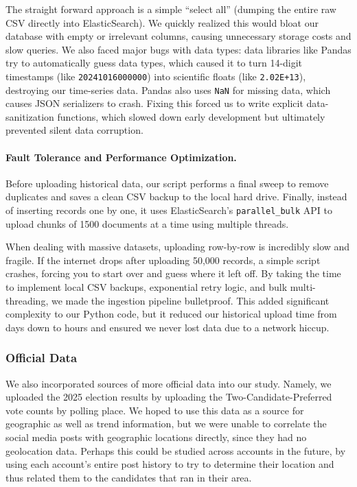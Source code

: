 The straight forward approach is a simple ``select all'' (dumping the entire raw CSV directly into ElasticSearch). We quickly realized this would bloat our database with empty or irrelevant columns, causing unnecessary storage costs and slow queries. We also faced major bugs with data types: data libraries like Pandas try to automatically guess data types, which caused it to turn 14-digit timestamps (like \texttt{20241016000000}) into scientific floats (like \texttt{2.02E+13}), destroying our time-series data. Pandas also uses \texttt{NaN} for missing data, which causes JSON serializers to crash. Fixing this forced us to write explicit data-sanitization functions, which slowed down early development but ultimately prevented silent data corruption.

\paragraph{Fault Tolerance and Performance Optimization.}
Before uploading historical data, our script performs a final sweep to remove duplicates and saves a clean CSV backup to the local hard drive. Finally, instead of inserting records one by one, it uses ElasticSearch's \texttt{parallel\_bulk} API to upload chunks of 1500 documents at a time using multiple threads.

When dealing with massive datasets, uploading row-by-row is incredibly slow and fragile. If the internet drops after uploading 50,000 records, a simple script crashes, forcing you to start over and guess where it left off. By taking the time to implement local CSV backups, exponential retry logic, and bulk multi-threading, we made the ingestion pipeline bulletproof. This added significant complexity to our Python code, but it reduced our historical upload time from days down to hours and ensured we never lost data due to a network hiccup.

\subsubsection{Official Data}

We also incorporated sources of more official data into our study. Namely, we uploaded the 2025 election results \cite{aec_federal_election_2025} by uploading the Two-Candidate-Preferred vote counts by polling place. We hoped to use this data as a source for geographic as well as trend information, but we were unable to correlate the social media posts with geographic locations directly, since they had no geolocation data. Perhaps this could be studied across accounts in the future, by using each account's entire post history to try to determine their location and thus related them to the candidates that ran in their area.

